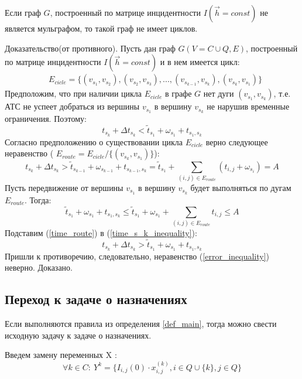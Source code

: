 \documentclass[]{TAACpaper}
\begin{document}
\newtheorem{Lem2}{Лемма}
\begin{Lem}
Если граф  $G$, построенный по матрице инцидентности $I(\vec{h}=const)$ не является мульграфом, то такой граф не имеет циклов.
\end{Lem}
Доказательство(от противного). Пусть дан граф $G(V={C \cup Q}, E)$, построенный по матрице инцидентности  $I(\vec{h}=const)$ и в нем имеется цикл: \begin{align*}
&E_{cicle}=\{(v_{s_1},v_{s_2}),(v_{s_2},v_{s_3}),...,(v_{s_{k-1}},v_{s_k}),(v_{s_k},v_{s_1})\}
\end{align*}
Предположим, что при наличии цикла $E_{cicle}$ в графе $G$ нет дуги $(v_{s_1},v_{s_k})$, т.е. АТС не успеет добраться из вершины $v_{s_1}$ в вершину $v_{s_k}$ не нарушив временные ограничения. Поэтому:
\begin{equation} \label{error_inequality}
 t_{s_k} + \Delta t_{s_k} <  \tilde{t}_{s_1} + \omega_{s_1} + t_{s_1,s_k}
\end{equation}
Согласно предположению о существовании цикла $E_{cicle}$ верно следующее неравенство ( $E_{route}=E_{cicle} / \{(v_{s_k},v_{s_1}) \}$):
\begin{equation} \label{time_s_k_inequality}
 t_{s_k} + \Delta t_{s_k} > \tilde{t}_{s_{k-1}} + \omega_{s_{k-1}} + t_{s_{k-1},s_k} = \tilde{t}_{s_1} +  \sum_{(i,j) \in E_{route}} (t_{i,j} +  \omega_{s_i}) = A
\end{equation}
Пусть передвижение от вершины $v_{s_1}$ в вершину $v_{s_k}$ будет выполняться по дугам $E_{route}$. Тогда:
\begin{equation} \label{time_route}
 \tilde{t}_{s_1} + \omega_{s_1} + t_{s_1,s_k} \leq \tilde{t}_{s_1} + \omega_{s_1} + \sum_{(i,j) \in E_{route}} t_{i,j} \leq A
\end{equation}
Подставим (\ref{time_route}) в (\ref{time_s_k_inequality}):
\begin{equation} \label{true_inequality}
 t_{s_k} + \Delta t_{s_k} > \tilde{t}_{s_1} + \omega_{s_1} + t_{s_1,s_k}
\end{equation}
Пришли к противоречию, следовательно, неравенство (\ref{error_inequality}) неверно. Доказано.

\subsection{Переход к задаче о назначениях}
Если выполняются правила из определения \ref{def_main}, тогда можно свести исходную задачу к задаче о назначениях.

Введем замену переменных X :
\begin{equation} \label{y_replace}
\forall k \in C: ~Y^k = \{ I_{i,j}(0) \cdot x^{(k)}_{i,j} , i \in Q \cup  \{k\} , j \in Q  \}
\end{equation}
\end{document}
